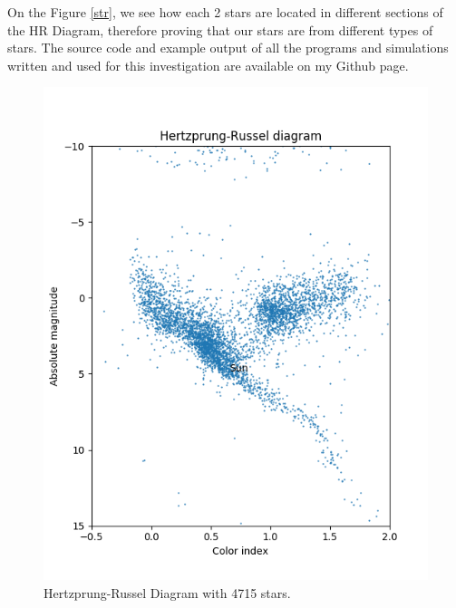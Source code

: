 \documentclass{article}
\begin{document}
  On the Figure \ref{str}, we see how each 2 stars are located in different sections of the HR Diagram, therefore proving that our stars are from different types of stars. The source code and example output of all the programs and simulations written and used for this investigation are available on my Github page.\cite{github}\\
  
  \begin{figure}[h]
    \centering
    \begin{minipage}[b]{0.45\textwidth}
      \includegraphics[width=\textwidth]{full.png}
      \caption{Hertzprung-Russel Diagram with 4715 stars.}
      \label{full}
    \end{minipage}
    \hfill
    \begin{minipage}[b]{0.45\textwidth}

\end{minipage}
\end{figure}
\end{document}
